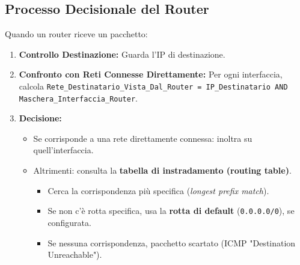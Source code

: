 \subsection{Processo Decisionale del Router}
Quando un router riceve un pacchetto:
\begin{enumerate}
    \item \textbf{Controllo Destinazione:} Guarda l'IP di destinazione.
    \item \textbf{Confronto con Reti Connesse Direttamente:} Per ogni interfaccia, calcola \texttt{Rete\_Destinatario\_Vista\_Dal\_Router = IP\_Destinatario AND Maschera\_Interfaccia\_Router}.
    \item \textbf{Decisione:}
    \begin{itemize}
        \item Se corrisponde a una rete direttamente connessa: inoltra su quell'interfaccia.
        \item Altrimenti: consulta la \textbf{tabella di instradamento (routing table)}.
        \begin{itemize}
            \item Cerca la corrispondenza più specifica (\textit{longest prefix match}).
            \item Se non c'è rotta specifica, usa la \textbf{rotta di default} (\texttt{0.0.0.0/0}), se configurata.
            \item Se nessuna corrispondenza, pacchetto scartato (ICMP "Destination Unreachable").
        \end{itemize}
    \end{itemize}
\end{enumerate}

